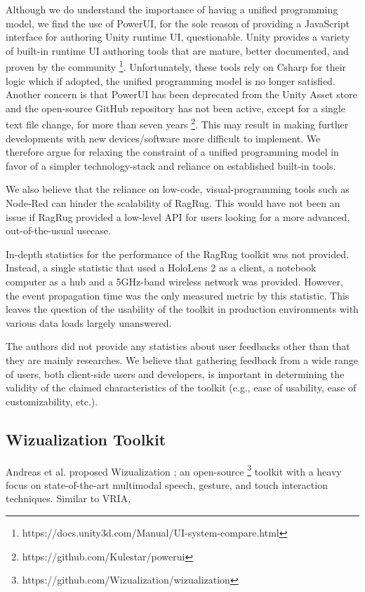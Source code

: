 \documentclass{vgtc}                          %
\begin{document}
\noindent Although we do understand the importance of having a unified programming model, we find the use of
PowerUI, for the sole reason of providing a JavaScript interface for authoring Unity runtime UI,
questionable. Unity provides a variety of built-in runtime UI authoring tools that are mature,
better documented, and proven by the community \footnote{https://docs.unity3d.com/Manual/UI-system-compare.html}.
Unfortunately, these tools rely on Csharp for their logic which if adopted, the unified programming model is
no longer satisfied. Another concern is that PowerUI has
been deprecated from the Unity Asset store and the open-source GitHub repository has not been active, except
for a single text file change, for more than seven years \footnote{https://github.com/Kulestar/powerui}.
This may result in making further developments with new devices/software more difficult to implement.
We therefore argue for relaxing the constraint of a unified programming model in favor of a simpler 
technology-stack and reliance on established built-in tools.

\smallskip

\noindent We also believe that the reliance on low-code, visual-programming tools such as Node-Red can hinder
the scalability of RagRug. This would have not been an issue if RagRug provided a low-level API for users
looking for a more advanced, out-of-the-usual usecase.

\medskip

\noindent In-depth statistics for the performance of the RagRug toolkit was not provided. Instead, a single
statistic that used a HoloLens 2 as a client, a notebook computer as a hub and a 5GHz-band wireless network
was provided. However, the event propagation time was the only measured metric by this statistic.
This leaves the question of the usability of the toolkit in production environments with various data loads
largely unanswered.

\medskip

\noindent The authors did not provide any statistics about user feedbacks other than that they are mainly
researches. We believe that gathering feedback from a wide range of users, both client-side users and
developers, is important in determining the validity of the claimed characteristics of the toolkit (e.g.,
ease of usability, ease of customizability, etc.).

\subsection{Wizualization Toolkit}
\noindent Andreas et al. proposed Wizualization \cite{wizualization_toolkit}; an open-source \footnote{https://github.com/Wizualization/wizualization}
toolkit with a heavy focus on state-of-the-art multimodal speech, gesture, and touch interaction techniques.
Similar to VRIA,
\end{document}
